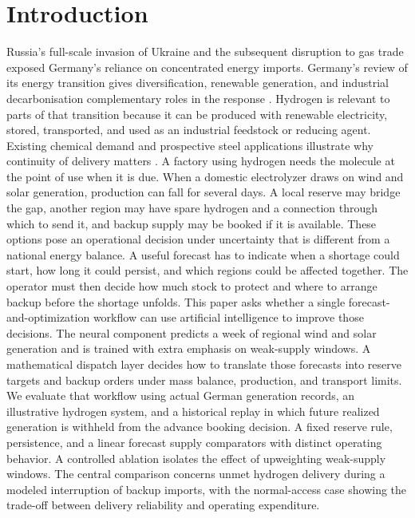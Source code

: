 \documentclass[10pt,a4paper,twocolumn]{article}
\begin{document}
\section{Introduction}
Russia's full-scale invasion of Ukraine and the subsequent disruption to gas trade exposed Germany's reliance on concentrated energy imports. Germany's review of its energy transition gives diversification, renewable generation, and industrial decarbonisation complementary roles in the response \citep{iea2025,roadmap2024}. Hydrogen is relevant to parts of that transition because it can be produced with renewable electricity, stored, transported, and used as an industrial feedstock or reducing agent. Existing chemical demand and prospective steel applications illustrate why continuity of delivery matters \citep{strategy,imports2024}. A factory using hydrogen needs the molecule at the point of use when it is due. When a domestic electrolyzer draws on wind and solar generation, production can fall for several days. A local reserve may bridge the gap, another region may have spare hydrogen and a connection through which to send it, and backup supply may be booked if it is available. These options pose an operational decision under uncertainty that is different from a national energy balance. A useful forecast has to indicate when a shortage could start, how long it could persist, and which regions could be affected together. The operator must then decide how much stock to protect and where to arrange backup before the shortage unfolds. This paper asks whether a single forecast-and-optimization workflow can use artificial intelligence to improve those decisions. The neural component predicts a week of regional wind and solar generation and is trained with extra emphasis on weak-supply windows. A mathematical dispatch layer decides how to translate those forecasts into reserve targets and backup orders under mass balance, production, and transport limits. We evaluate that workflow using actual German generation records, an illustrative hydrogen system, and a historical replay in which future realized generation is withheld from the advance booking decision. A fixed reserve rule, persistence, and a linear forecast supply comparators with distinct operating behavior. A controlled ablation isolates the effect of upweighting weak-supply windows. The central comparison concerns unmet hydrogen delivery during a modeled interruption of backup imports, with the normal-access case showing the trade-off between delivery reliability and operating expenditure.
\end{document}
